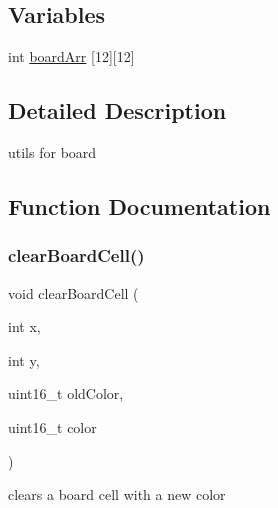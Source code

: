 \subsection*{Variables}
\begin{DoxyCompactItemize}
\item 
int \mbox{\hyperlink{group__board_ga71c192646429486a7ac23c7805a8ed6c}{board\+Arr}} \mbox{[}12\mbox{]}\mbox{[}12\mbox{]}
\end{DoxyCompactItemize}


\subsection{Detailed Description}
utils for board 

\subsection{Function Documentation}
\mbox{\label{group__board_ga5559e08677901d82c4ad934914c0b9dc}} 
\subsubsection{\texorpdfstring{clearBoardCell()}{clearBoardCell()}}
{\footnotesize\ttfamily void clear\+Board\+Cell (\begin{DoxyParamCaption}\item[{int}]{x,  }\item[{int}]{y,  }\item[{uint16\+\_\+t}]{old\+Color,  }\item[{uint16\+\_\+t}]{color }\end{DoxyParamCaption})}



clears a board cell with a new color 


